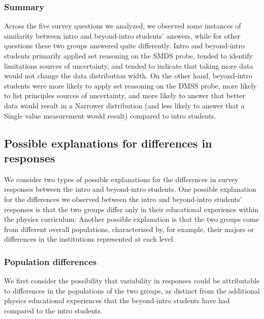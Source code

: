 \documentclass[english,aps,prstper,reprint,showpacs,longbibliography,superscriptaddress,nofootinbib]{revtex4-2}
\begin{document}
\subsubsection{Summary}

Across the five survey questions we analyzed, we observed some instances of similarity between intro and beyond-intro students' answers, while for other questions these two groups answered quite differently. Intro and beyond-intro students primarily applied set reasoning on the SMDS probe, tended to identify limitations sources of uncertainty, and tended to indicate that taking more data would not change the data distribution width. On the other hand, beyond-intro students were more likely to apply set reasoning on the DMSS probe, more likely to list principles sources of uncertainty, and more likely to answer that better data would result in a Narrower distribution (and less likely to answer that a Single value measurement would result) compared to intro students.

\subsection{Possible explanations for differences in responses}

We consider two types of possible explanations for the differences in survey responses between the intro and beyond-intro students. One possible explanation for the differences we observed between the intro and beyond-intro students' responses is that the two groups differ only in their educational experience within the physics curriculum. Another possible explanation is that the two groups come from different overall populations, characterized by, for example, their majors or differences in the institutions represented at each level.

\subsubsection{Population differences}

We first consider the possibility that variability in responses could be attributable to differences in the populations of the two groups, as distinct from the additional physics educational experiences that the beyond-intro students have had compared to the intro students. 
\end{document}
